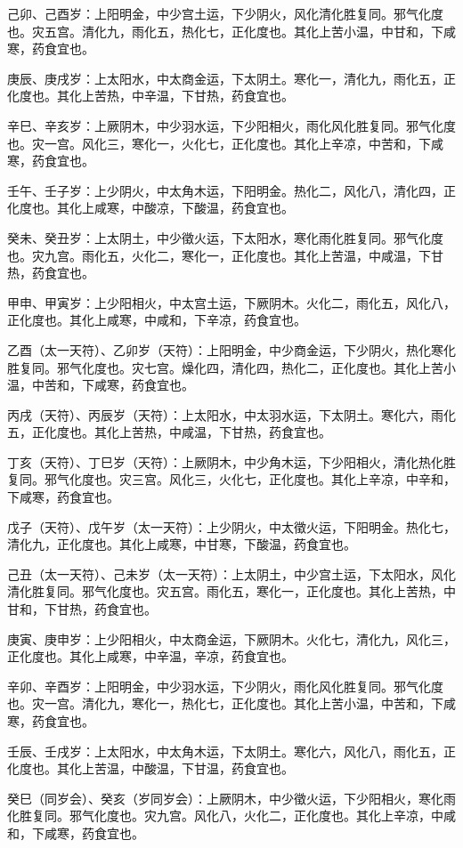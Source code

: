 \documentclass{article}%
\begin{document}
己卯、己酉岁：上阳明金，中少宫土运，下少阴火，风化清化胜复同。邪气化度也。灾五宫。清化九，雨化五，热化七，正化度也。其化上苦小温，中甘和，下咸寒，药食宜也。

庚辰、庚戌岁：上太阳水，中太商金运，下太阴土。寒化一，清化九，雨化五，正化度也。其化上苦热，中辛温，下甘热，药食宜也。

辛巳、辛亥岁：上厥阴木，中少羽水运，下少阳相火，雨化风化胜复同。邪气化度也。灾一宫。风化三，寒化一，火化七，正化度也。其化上辛凉，中苦和，下咸寒，药食宜也。

壬午、壬子岁：上少阴火，中太角木运，下阳明金。热化二，风化八，清化四，正化度也。其化上咸寒，中酸凉，下酸温，药食宜也。

癸未、癸丑岁：上太阴土，中少徵火运，下太阳水，寒化雨化胜复同。邪气化度也。灾九宫。雨化五，火化二，寒化一，正化度也。其化上苦温，中咸温，下甘热，药食宜也。

甲申、甲寅岁：上少阳相火，中太宫土运，下厥阴木。火化二，雨化五，风化八，正化度也。其化上咸寒，中咸和，下辛凉，药食宜也。

乙酉（太一天符）、乙卯岁（天符）：上阳明金，中少商金运，下少阴火，热化寒化胜复同。邪气化度也。灾七宫。燥化四，清化四，热化二，正化度也。其化上苦小温，中苦和，下咸寒，药食宜也。

丙戌（天符）、丙辰岁（天符）：上太阳水，中太羽水运，下太阴土。寒化六，雨化五，正化度也。其化上苦热，中咸温，下甘热，药食宜也。

丁亥（天符）、丁巳岁（天符）：上厥阴木，中少角木运，下少阳相火，清化热化胜复同。邪气化度也。灾三宫。风化三，火化七，正化度也。其化上辛凉，中辛和，下咸寒，药食宜也。

戊子（天符）、戊午岁（太一天符）：上少阴火，中太徵火运，下阳明金。热化七，清化九，正化度也。其化上咸寒，中甘寒，下酸温，药食宜也。

己丑（太一天符）、己未岁（太一天符）：上太阴土，中少宫土运，下太阳水，风化清化胜复同。邪气化度也。灾五宫。雨化五，寒化一，正化度也。其化上苦热，中甘和，下甘热，药食宜也。

庚寅、庚申岁：上少阳相火，中太商金运，下厥阴木。火化七，清化九，风化三，正化度也。其化上咸寒，中辛温，辛凉，药食宜也。

辛卯、辛酉岁：上阳明金，中少羽水运，下少阴火，雨化风化胜复同。邪气化度也。灾一宫。清化九，寒化一，热化七，正化度也。其化上苦小温，中苦和，下咸寒，药食宜也。

壬辰、壬戌岁：上太阳水，中太角木运，下太阴土。寒化六，风化八，雨化五，正化度也。其化上苦温，中酸温，下甘温，药食宜也。

癸巳（同岁会）、癸亥（岁同岁会）：上厥阴木，中少徵火运，下少阳相火，寒化雨化胜复同。邪气化度也。灾九宫。风化八，火化二，正化度也。其化上辛凉，中咸和，下咸寒，药食宜也。
\end{document}
